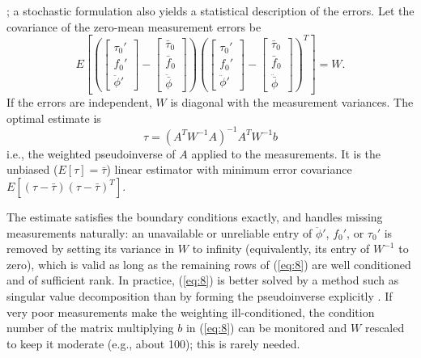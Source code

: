 \documentclass[11pt]{article}
\begin{document}
\cite{Strang1988}; a stochastic formulation \cite{StarkWoods1986} also yields
a statistical description of the errors. Let the covariance of the
zero-mean measurement errors be
\[
E\left[\left(\begin{bmatrix}\tau_0'\\ f_0'\\ \ddot{\phi}'\end{bmatrix}
- \begin{bmatrix}\bar{\tau}_0\\ \bar{f}_0\\ \ddot{\bar{\phi}}\end{bmatrix}\right)
\left(\begin{bmatrix}\tau_0'\\ f_0'\\ \ddot{\phi}'\end{bmatrix}
- \begin{bmatrix}\bar{\tau}_0\\ \bar{f}_0\\ \ddot{\bar{\phi}}\end{bmatrix}\right)^T
\right] = W.
\]
If the errors are independent, $W$ is diagonal with the measurement
variances. The optimal estimate is
\begin{equation}
\tau = (A^T W^{-1} A)^{-1} A^T W^{-1} b
\label{eq:8}
\end{equation}
i.e., the weighted pseudoinverse of $A$ applied to the measurements. It is
the unbiased ($E[\tau]=\bar{\tau}$) linear estimator with minimum error
covariance $E[(\tau-\bar{\tau})(\tau-\bar{\tau})^T]$.

The estimate satisfies the boundary conditions exactly, and handles missing
measurements naturally: an unavailable or unreliable entry of $\ddot{\phi}'$,
$f_0'$, or $\tau_0'$ is removed by setting its variance in $W$ to infinity
(equivalently, its entry of $W^{-1}$ to zero), which is valid as long as the
remaining rows of (\ref{eq:8}) are well conditioned and of sufficient rank.
In practice, (\ref{eq:8}) is better solved by a method such as singular value
decomposition than by forming the pseudoinverse explicitly
\cite{GolubVanLoan1989}. If very poor measurements make the weighting
ill-conditioned, the condition number of the matrix multiplying $b$ in
(\ref{eq:8}) can be monitored and $W$ rescaled to keep it moderate (e.g.,
about 100); this is rarely needed.
\end{document}
